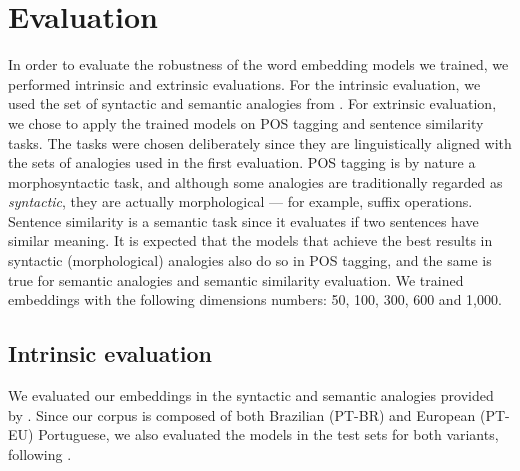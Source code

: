 \section{Evaluation}

In order to evaluate the robustness of the word embedding models we trained, we performed intrinsic and extrinsic evaluations. For the intrinsic evaluation, we used the set of syntactic and semantic analogies from \cite{rodriguesetal2016}. For extrinsic evaluation, we chose to apply the trained models on POS tagging and sentence similarity tasks. The tasks were chosen deliberately since they are linguistically aligned with the sets of analogies used in the first evaluation. POS tagging is by nature a morphosyntactic task, and although some analogies are traditionally regarded as \emph{syntactic}, they are actually morphological --- for example, suffix operations. Sentence similarity is a semantic task since it evaluates if two sentences have similar meaning. It is expected that the models that achieve the best results in syntactic (morphological) analogies also do so in POS tagging, and the same is true for semantic analogies and semantic similarity evaluation. We trained embeddings with the following dimensions numbers: 50, 100, 300, 600 and 1,000.



\subsection{Intrinsic evaluation}

We evaluated our embeddings in the syntactic and semantic analogies provided by \cite{rodriguesetal2016}. Since our corpus is composed of both Brazilian (PT-BR) and European (PT-EU) Portuguese, we also evaluated the models in the test sets for both variants, following \cite{rodriguesetal2016}.

